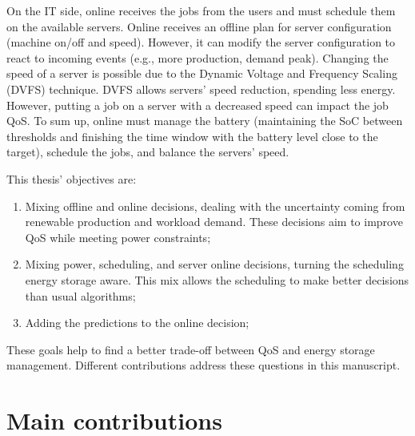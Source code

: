 On the IT side, online receives the jobs from the users and must schedule them on the available servers. Online receives an offline plan for server configuration (machine on/off and speed). However, it can modify the server configuration to react to incoming events (e.g., more production, demand peak). Changing the speed of a server is possible due to the Dynamic Voltage and Frequency Scaling (DVFS) technique. DVFS allows servers' speed reduction, spending less energy. However, putting a job on a server with a decreased speed can impact the job QoS. To sum up, online must manage the battery (maintaining the SoC between thresholds and finishing the time window with the battery level close to the target), schedule the jobs, and balance the servers' speed.

This thesis' objectives are:
\begin{enumerate}
    \item Mixing offline and online decisions, dealing with the uncertainty coming from renewable production and workload demand. These decisions aim to improve QoS while meeting power constraints;
    \item Mixing power, scheduling, and server online decisions, turning the scheduling energy storage aware. This mix allows the scheduling to make better decisions than usual algorithms;
    \item Adding the predictions to the online decision;
\end{enumerate}

These goals help to find a better trade-off between QoS and energy storage management. Different contributions address these questions in this manuscript.

\section{Main contributions}

